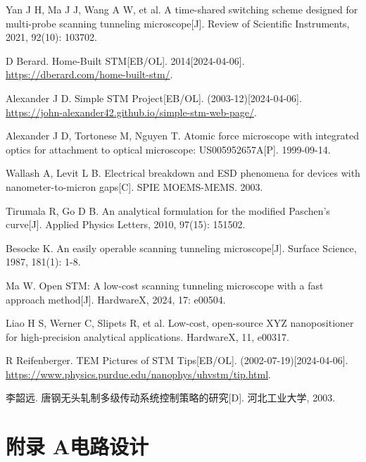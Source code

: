 \documentclass{article}
\begin{document}
\begin{spacing}{1.5}
\begin{thebibliography}{25}
	 Yan J H, Ma J J, Wang A W, et al. A time-shared switching scheme designed for multi-probe scanning tunneling microscope[J]. Review of Scientific Instruments, 2021, 92(10): 103702.
	
	 D Berard. Home-Built STM[EB/OL]. 2014[2024-04-06]. \href{https://dberard.com/home-built-stm/}{https://dberard.com/home-built-stm/}.
	
	 Alexander J D. Simple STM Project[EB/OL]. (2003-12)[2024-04-06]. \href{https://john-alexander42.github.io/simple-stm-web-page/}{https://john-alexander42.github.io/simple-stm-web-page/}.
	
	 Alexander J D, Tortonese M, Nguyen T. Atomic force microscope with integrated optics for attachment to optical microscope: US005952657A[P]. 1999-09-14.
	
	 Wallash A, Levit L B. Electrical breakdown and ESD phenomena for devices with nanometer-to-micron gaps[C]. SPIE MOEMS-MEMS. 2003. 
	
	 Tirumala R, Go D B. An analytical formulation for the modified Paschen’s curve[J]. Applied Physics Letters, 2010, 97(15): 151502.
	
	 Besocke K. An easily operable scanning tunneling microscope[J]. Surface Science, 1987, 181(1): 1-8.
	
	 Ma W. Open STM: A low-cost scanning tunneling microscope with a fast approach method[J]. HardwareX, 2024, 17: e00504.
	
	 Liao H S, Werner C, Slipets R, et al. Low-cost, open-source XYZ nanopositioner for high-precision analytical applications. HardwareX, 11, e00317.
	
	 R Reifenberger. TEM Pictures of STM Tips[EB/OL]. (2002-07-19)[2024-04-06]. \href{https://www.physics.purdue.edu/nanophys/uhvstm/tip.html}{https://www.physics.purdue.edu/nanophys/uhvstm/tip.html}.
	
	 李韶远. 唐钢无头轧制多级传动系统控制策略的研究[D]. 河北工业大学, 2003.
	
	
\end{thebibliography}
\endgroup


\newpage
\appendix
\section*{附录 A\quad 电路设计}
{} %
\label{app:A}


\end{spacing}
\end{document}

